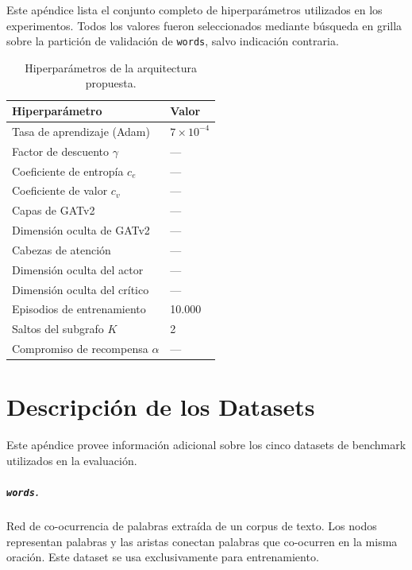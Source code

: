 \documentclass[11pt,a4paper,twoside]{tesis}
\begin{document}
Este apéndice lista el conjunto completo de hiperparámetros utilizados en los
experimentos. Todos los valores fueron seleccionados mediante búsqueda en grilla sobre
la partición de validación de \texttt{words}, salvo indicación contraria.

\begin{table}[H]
\centering
\caption{Hiperparámetros de la arquitectura propuesta.}
\label{tab:hyperparams}
\begin{tabular}{ll}
\toprule
Hiperparámetro & Valor \\
\midrule
Tasa de aprendizaje (Adam)    & $7 \times 10^{-4}$ \\
Factor de descuento $\gamma$  & ---                \\
Coeficiente de entropía $c_e$ & ---                \\
Coeficiente de valor $c_v$    & ---                \\
Capas de GATv2                & ---                \\
Dimensión oculta de GATv2     & ---                \\
Cabezas de atención           & ---                \\
Dimensión oculta del actor    & ---                \\
Dimensión oculta del crítico  & ---                \\
Episodios de entrenamiento    & 10.000             \\
Saltos del subgrafo $K$       & 2                  \\
Compromiso de recompensa $\alpha$ & ---            \\
\bottomrule
\end{tabular}
\end{table}



\chapter{Descripción de los Datasets}
\label{app:datasets}

Este apéndice provee información adicional sobre los cinco datasets de benchmark
utilizados en la evaluación.

\paragraph{\texttt{words}.}
Red de co-ocurrencia de palabras extraída de un corpus de texto. Los nodos representan
palabras y las aristas conectan palabras que co-ocurren en la misma oración. Este dataset
se usa exclusivamente para entrenamiento.
\end{document}
